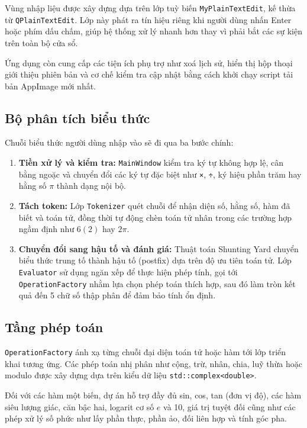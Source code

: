 \documentclass[12pt,a4paper]{article}
\begin{document}
Vùng nhập liệu được xây dựng dựa trên lớp tuỳ biến \texttt{MyPlainTextEdit}, kế thừa từ \texttt{QPlainTextEdit}. Lớp này phát ra tín hiệu riêng khi người dùng nhấn Enter hoặc phím dấu chấm, giúp hệ thống xử lý nhanh hơn thay vì phải bắt các sự kiện trên toàn bộ cửa sổ.\cite{plainText}

Ứng dụng còn cung cấp các tiện ích phụ trợ như xoá lịch sử, hiển thị hộp thoại giới thiệu phiên bản và cơ chế kiểm tra cập nhật bằng cách khởi chạy script tải bản AppImage mới nhất.\cite{mainwindow}

\subsection{Bộ phân tích biểu thức}
Chuỗi biểu thức người dùng nhập vào sẽ đi qua ba bước chính:\cite{mainwindow,parser}
\begin{enumerate}[label=\arabic*.]
    \item \textbf{Tiền xử lý và kiểm tra:} \texttt{MainWindow} kiểm tra ký tự không hợp lệ, cân bằng ngoặc và chuyển đổi các ký tự đặc biệt như \texttt{×}, \texttt{÷}, ký hiệu phần trăm hay hằng số $\pi$ thành dạng nội bộ.
    \item \textbf{Tách token:} Lớp \texttt{Tokenizer} quét chuỗi để nhận diện số, hằng số, hàm đã biết và toán tử, đồng thời tự động chèn toán tử nhân trong các trường hợp ngầm định như $6(2)$ hay $2\pi$.\cite{tokenizer}
    \item \textbf{Chuyển đổi sang hậu tố và đánh giá:} Thuật toán Shunting Yard chuyển biểu thức trung tố thành hậu tố (postfix) dựa trên độ ưu tiên toán tử.\cite{shunting} Lớp \texttt{Evaluator} sử dụng ngăn xếp để thực hiện phép tính, gọi tới \texttt{OperationFactory} nhằm lựa chọn phép toán thích hợp, sau đó làm tròn kết quả đến 5 chữ số thập phân để đảm bảo tính ổn định.\cite{evaluator}
\end{enumerate}

\subsection{Tầng phép toán}
\texttt{OperationFactory} ánh xạ từng chuỗi đại diện toán tử hoặc hàm tới lớp triển khai tương ứng. Các phép toán nhị phân như cộng, trừ, nhân, chia, luỹ thừa hoặc modulo được xây dựng dựa trên kiểu dữ liệu \texttt{std::complex<double>}.\cite{operationfactory}

Đối với các hàm một biến, dự án hỗ trợ đầy đủ sin, cos, tan (đơn vị độ), các hàm siêu lượng giác, căn bậc hai, logarit cơ số $e$ và 10, giá trị tuyệt đối cũng như các phép xử lý số phức như lấy phần thực, phần ảo, đối liên hợp và tính góc pha.\cite{operations}
\end{document}
